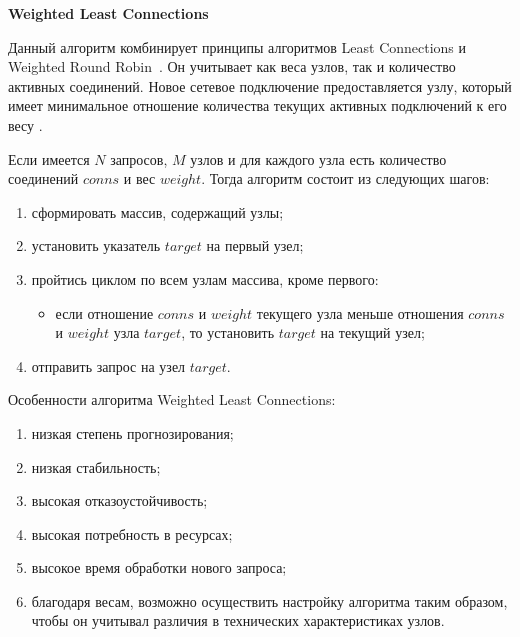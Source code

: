\textbf{Weighted Least Connections}

Данный алгоритм комбинирует принципы алгоритмов Least Connections и Weighted Round Robin~\cite{part_algos}.
Он учитывает как веса узлов, так и количество активных соединений. 
Новое сетевое подключение предоставляется узлу, который имеет минимальное отношение количества текущих активных подключений к его весу \cite{mainsource}.

Если имеется $N$ запросов, $M$ узлов и для каждого узла есть количество соединений $conns$ и вес $weight$.
Тогда алгоритм состоит из следующих шагов:
\begin{enumerate}
	\item сформировать массив, содержащий узлы;
	\item установить указатель $target$ на первый узел;
	\item пройтись циклом по всем узлам массива, кроме первого:
	\begin{itemize}
	\item если отношение $conns$ и $weight$ текущего узла меньше отношения $conns$ и $weight$ узла $target$, то установить $target$ на текущий узел; 
	\end{itemize}
	\item отправить запрос на узел $target$.
\end{enumerate}

Особенности алгоритма Weighted Least Connections:
\begin{enumerate}
	\item низкая степень прогнозирования; 
	\item низкая стабильность;
	\item высокая отказоустойчивость;
	\item высокая потребность в ресурсах;
	\item высокое время обработки нового запроса;
	\item благодаря весам, возможно осуществить настройку алгоритма таким образом, чтобы он учитывал различия в технических характеристиках узлов.
\end{enumerate}